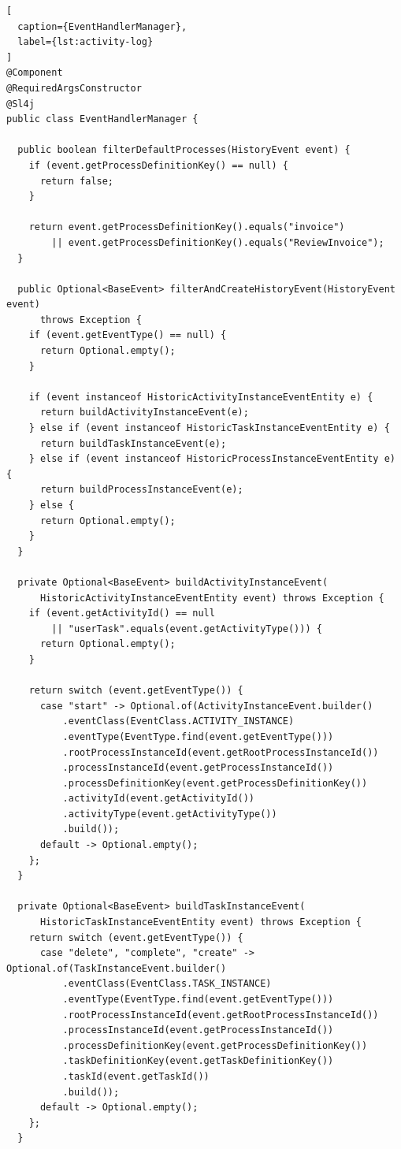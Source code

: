 \begin{lstlisting}[
  caption={EventHandlerManager},
  label={lst:activity-log}
]
@Component
@RequiredArgsConstructor
@Sl4j
public class EventHandlerManager {

  public boolean filterDefaultProcesses(HistoryEvent event) {
    if (event.getProcessDefinitionKey() == null) {
      return false;
    }

    return event.getProcessDefinitionKey().equals("invoice")
        || event.getProcessDefinitionKey().equals("ReviewInvoice");
  }

  public Optional<BaseEvent> filterAndCreateHistoryEvent(HistoryEvent event)
      throws Exception {
    if (event.getEventType() == null) {
      return Optional.empty();
    }

    if (event instanceof HistoricActivityInstanceEventEntity e) {
      return buildActivityInstanceEvent(e);
    } else if (event instanceof HistoricTaskInstanceEventEntity e) {
      return buildTaskInstanceEvent(e);
    } else if (event instanceof HistoricProcessInstanceEventEntity e) {
      return buildProcessInstanceEvent(e);
    } else {
      return Optional.empty();
    }
  }

  private Optional<BaseEvent> buildActivityInstanceEvent(
      HistoricActivityInstanceEventEntity event) throws Exception {
    if (event.getActivityId() == null
        || "userTask".equals(event.getActivityType())) {
      return Optional.empty();
    }

    return switch (event.getEventType()) {
      case "start" -> Optional.of(ActivityInstanceEvent.builder()
          .eventClass(EventClass.ACTIVITY_INSTANCE)
          .eventType(EventType.find(event.getEventType()))
          .rootProcessInstanceId(event.getRootProcessInstanceId())
          .processInstanceId(event.getProcessInstanceId())
          .processDefinitionKey(event.getProcessDefinitionKey())
          .activityId(event.getActivityId())
          .activityType(event.getActivityType())
          .build());
      default -> Optional.empty();
    };
  }

  private Optional<BaseEvent> buildTaskInstanceEvent(
      HistoricTaskInstanceEventEntity event) throws Exception {
    return switch (event.getEventType()) {
      case "delete", "complete", "create" -> Optional.of(TaskInstanceEvent.builder()
          .eventClass(EventClass.TASK_INSTANCE)
          .eventType(EventType.find(event.getEventType()))
          .rootProcessInstanceId(event.getRootProcessInstanceId())
          .processInstanceId(event.getProcessInstanceId())
          .processDefinitionKey(event.getProcessDefinitionKey())
          .taskDefinitionKey(event.getTaskDefinitionKey())
          .taskId(event.getTaskId())
          .build());
      default -> Optional.empty();
    };
  }


\end{lstlisting}
